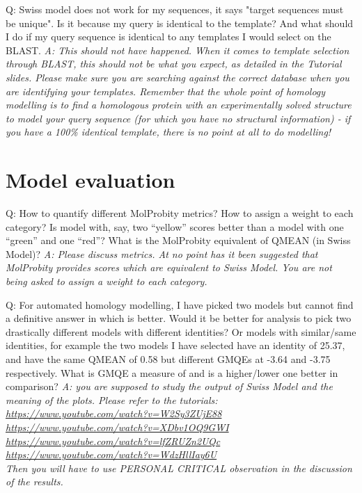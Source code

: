 \documentclass[10pt,a4paper]{article}
\begin{document}
Q: Swiss model does not work for my sequences, it says "target sequences must be unique". Is it because my query is identical to the template? And what should I do if my query sequence is identical to any templates I would select on the BLAST. \newline
\textit{A: This should not have happened. When it comes to template selection through BLAST, this should not be what you expect, as detailed in the Tutorial slides. Please make sure you are searching against the correct database when you are identifying your templates. Remember that the whole point of homology modelling is to find a homologous protein with an experimentally solved structure to model your query sequence (for which you have no structural information) - if you have a 100\% identical template, there is no point at all to do modelling! } \newline



\section{Model evaluation}
Q: How to quantify different MolProbity metrics? How to assign a weight to each category? Is model with, say, two “yellow” scores better than a model with one “green” and one “red”?  What is the MolProbity equivalent of QMEAN (in Swiss Model)? \newline
\textit{A: Please discuss metrics. At no point has it been suggested that MolProbity provides scores which are equivalent to Swiss Model. You are not being asked to assign a weight to each category.} \newline

Q: For automated homology modelling, I have picked two models but cannot find a definitive answer in which is better. Would it be better for analysis to pick two drastically different models with different identities? Or models with similar/same identities, for example the two models I have selected have an identity of 25.37, and have the same QMEAN of 0.58 but different GMQEs at -3.64 and -3.75 respectively. What is GMQE a measure of and is a higher/lower one better in comparison? \newline
\textit{A: you are supposed to study the output of Swiss Model and the meaning of the plots. Please refer to the tutorials: \\
\url{https://www.youtube.com/watch?v=W2Sy3ZUjE88} \\
\url{https://www.youtube.com/watch?v=XDbv1OQ9GWI} \\
\url{https://www.youtube.com/watch?v=lfZRUZn2UQc} \\
\url{https://www.youtube.com/watch?v=WdzHllIay6U} \\
Then you will have to use PERSONAL CRITICAL observation in the discussion of the results.} \newline
\end{document}
